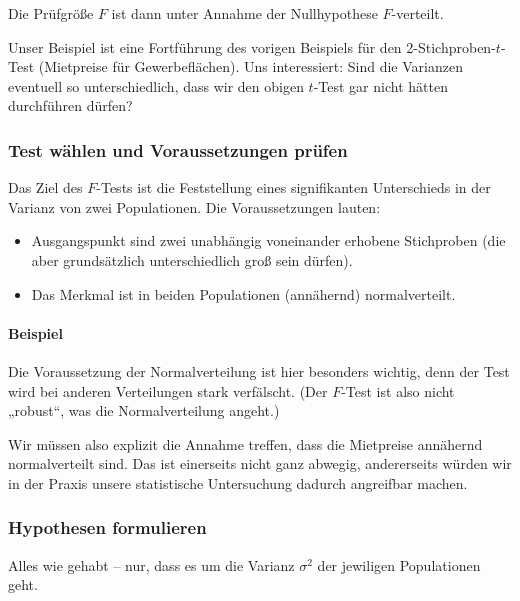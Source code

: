 \documentclass[
  ngerman,
]{article}
\providecommand{\tightlist}{%
  \setlength{\itemsep}{0pt}\setlength{\parskip}{0pt}}
\begin{document}
Die Prüfgröße \(F\) ist dann unter Annahme der Nullhypothese \(F\)-verteilt.

Unser Beispiel ist eine Fortführung des vorigen Beispiels für den 2-Stichproben-\(t\)-Test (Mietpreise für Gewerbeflächen). Uns interessiert: Sind die Varianzen eventuell so unterschiedlich, dass wir den obigen \(t\)-Test gar nicht hätten durchführen dürfen?

\hypertarget{test-wuxe4hlen-und-voraussetzungen-pruxfcfen-3}{%
\subsubsection{Test wählen und Voraussetzungen prüfen}\label{test-wuxe4hlen-und-voraussetzungen-pruxfcfen-3}}

Das Ziel des \(F\)-Tests ist die Feststellung eines signifikanten Unterschieds in der Varianz von zwei Populationen. Die Voraussetzungen lauten:

\begin{itemize}
\tightlist
\item
  Ausgangspunkt sind zwei unabhängig voneinander erhobene Stichproben (die aber grundsätzlich unterschiedlich groß sein dürfen).
\item
  Das Merkmal ist in beiden Populationen (annähernd) normalverteilt.
\end{itemize}

\hypertarget{beispiel-17}{%
\paragraph{Beispiel}\label{beispiel-17}}

Die Voraussetzung der Normalverteilung ist hier besonders wichtig, denn der Test wird bei anderen Verteilungen stark verfälscht. (Der \(F\)-Test ist also nicht „robust``, was die Normalverteilung angeht.)

Wir müssen also explizit die Annahme treffen, dass die Mietpreise annähernd normalverteilt sind. Das ist einerseits nicht ganz abwegig, andererseits würden wir in der Praxis unsere statistische Untersuchung dadurch angreifbar machen.

\hypertarget{hypothesen-formulieren-3}{%
\subsubsection{Hypothesen formulieren}\label{hypothesen-formulieren-3}}

Alles wie gehabt -- nur, dass es um die Varianz \(\sigma^2\) der jewiligen Populationen geht.
\end{document}
